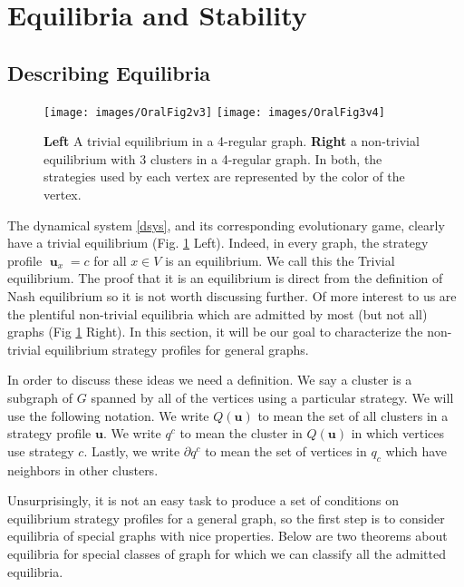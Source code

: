 \documentclass[]{article}
\DeclareMathOperator{\uu}{\mathbf{u}}
\begin{document}
	
	
	\section{Equilibria and Stability}\label{equilibria and stability}
	\subsection{Describing Equilibria}\label{describingequilibria}
	\begin{figure}
		\texttt{[image: images/OralFig2v3]}
		\texttt{[image: images/OralFig3v4]}
		\caption{\textbf{Left} A trivial equilibrium in a 4-regular graph. \textbf{Right} a non-trivial equilibrium with $3$ clusters in a 4-regular graph. In both, the strategies used by each vertex are represented by the color of the vertex.}
		\label{equilibria}
	\end{figure}
		
		The dynamical system \eqref{dsys}, and its corresponding evolutionary game, clearly have a trivial equilibrium (Fig. \ref{equilibria} Left). Indeed, in every graph, the strategy profile $\uu_x=c$ for all $x\in V$ is an equilibrium. We call this the Trivial equilibrium. The proof that it is an equilibrium is direct from the definition of Nash equilibrium so it is not worth discussing further. Of more interest to us are the plentiful non-trivial equilibria which are admitted by most (but not all) graphs (Fig \ref{equilibria} Right). In this section, it will be our goal to characterize the non-trivial equilibrium strategy profiles for general graphs.  
		
		In order to discuss these ideas we need a definition. We say a cluster is a subgraph of $G$ spanned by all of the vertices using a particular strategy. We will use the following notation.  We write $Q(\mathbf{u})$ to mean the set of all clusters in a strategy profile $\mathbf{u}$. We write $q^c$ to mean the cluster in $Q(\mathbf{u})$ in which vertices use strategy $c$. Lastly, we write $\partial q^c$ to mean the set of vertices in $q_c$ which have neighbors in other clusters.

		Unsurprisingly, it is not an easy task to produce a set of conditions on equilibrium strategy profiles for a general graph, so the first step is to consider equilibria of special graphs with nice properties. Below are two theorems about equilibria for special classes of graph for which we can classify all the admitted equilibria.
\end{document}
